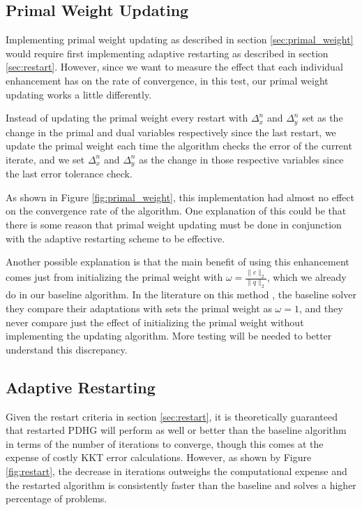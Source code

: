 \documentclass[twoside,12pt,openright]{report}  %
\begin{document}
\subsection{Primal Weight Updating}
Implementing primal weight updating as described in section \ref{sec:primal_weight} would require first implementing adaptive restarting as described in section \ref{sec:restart}. However, since we want to measure the effect that each individual enhancement has on the rate of convergence, in this test, our primal weight updating works a little differently.

Instead of updating the primal weight every restart with $\Delta_x^n$ and $\Delta_y^n$ set as the change in the primal and dual variables respectively since the last restart, we update the primal weight each time the algorithm checks the error of the current iterate, and we set $\Delta_x^n$ and $\Delta_y^n$ as the change in those respective variables since the last error tolerance check.

As shown in Figure \ref{fig:primal_weight}, this implementation had almost no effect on the convergence rate of the algorithm. One explanation of this could be that there is some reason that primal weight updating must be done in conjunction with the adaptive restarting scheme to be effective.

Another possible explanation is that the main benefit of using this enhancement comes just from initializing the primal weight with $\omega=\frac{\|c\|_2}{\|q\|_2}$, which we already do in our baseline algorithm. In the literature on this method \cite{applegate2}, the baseline solver they compare their adaptations with sets the primal weight as $\omega=1$, and they never compare just the effect of initializing the primal weight without implementing the updating algorithm. More testing will be needed to better understand this discrepancy.

\subsection{Adaptive Restarting}
Given the restart criteria in section \ref{sec:restart}, it is theoretically guaranteed that restarted PDHG will perform as well or better than the baseline algorithm in terms of the number of iterations to converge, though this comes at the expense of costly KKT error calculations. However, as shown by Figure \ref{fig:restart}, the decrease in iterations outweighs the computational expense and the restarted algorithm is consistently faster than the baseline and solves a higher percentage of problems.
\end{document}
